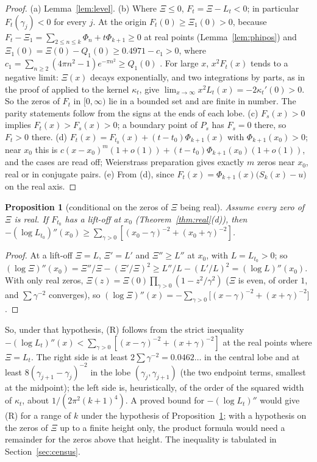 \documentclass[11pt]{article}
\theoremstyle{plain}
\newtheorem{proposition}[theorem]{Proposition}
\theoremstyle{definition}
\theoremstyle{remark}
\begin{document}
\begin{proof}
(a) Lemma~\ref{lem:level}.
(b) Where $\Xi \le 0$, $F_t = \Xi - L_t < 0$; in particular $F_t(\gamma_j) < 0$
for every $j$. At the origin $F_t(0) \ge \Xi_1(0) > 0$, because
$F_t - \Xi_1 = \sum_{2 \le n \le k}\Phi_n + t\Phi_{k+1} \ge 0$ at real points
(Lemma~\ref{lem:phipos}) and $\Xi_1(0) = \Xi(0) - Q_1(0) \ge 0.4971 - c_1 > 0$,
where $c_1 = \sum_{n \ge 2}(4\pi n^2 - 1)e^{-\pi n^2} \ge Q_1(0)$
\cite[proof of Corollary~3.5]{Tya}. For large $x$, $x^2F_t(x)$ tends to a
negative limit: $\Xi(x)$ decays exponentially, and two integrations by parts,
as in the proof of \cite[Proposition~3.4]{Tya} applied to the kernel
$\kappa_t$, give $\lim_{x\to\infty} x^2L_t(x) = -2\kappa_t'(0) > 0$. So the
zeros of $F_t$ in $[0,\infty)$ lie in a bounded set and are finite in number.
The parity statements follow from the signs at the ends of each lobe.
(c) $F_s(x) > 0$ implies $F_t(x) > F_s(x) > 0$; a boundary point of $P_s$ has
$F_s = 0$ there, so $F_t > 0$ there.
(d) $F_t(x) = F_{t_0}(x) + (t - t_0)\Phi_{k+1}(x)$ with $\Phi_{k+1}(x_0) > 0$;
near $x_0$ this is
$c(x - x_0)^m(1 + o(1)) + (t - t_0)\Phi_{k+1}(x_0)(1 + o(1))$, and the cases
are read off; Weierstrass preparation gives exactly $m$ zeros near $x_0$, real
or in conjugate pairs.
(e) From (d), since $F_t(x) = \Phi_{k+1}(x)\bigl(S_k(x) - u\bigr)$ on the real
axis.
\end{proof}


\begin{proposition}[conditional on the zeros of $\Xi$ being real]\label{prop:liftoff}
Assume every zero of $\Xi$ is real. If $F_{t_0}$ has a lift-off at $x_0$
(Theorem~\ref{thm:real}(d)), then
$-(\log L_{t_0})''(x_0) \ge \sum_{\gamma > 0}
[(x_0 - \gamma)^{-2} + (x_0 + \gamma)^{-2}]$.
\end{proposition}

\begin{proof}
At a lift-off $\Xi = L$, $\Xi' = L'$ and $\Xi'' \ge L''$ at $x_0$, with
$L = L_{t_0} > 0$; so
$(\log\Xi)''(x_0) = \Xi''/\Xi - (\Xi'/\Xi)^2 \ge L''/L - (L'/L)^2
= (\log L)''(x_0)$. With only real zeros,
$\Xi(z) = \Xi(0)\prod_{\gamma > 0}(1 - z^2/\gamma^2)$ ($\Xi$ is even, of
order $1$, and $\sum\gamma^{-2}$ converges), so
$(\log\Xi)''(x) = -\sum_{\gamma>0}\bigl[(x - \gamma)^{-2} + (x + \gamma)^{-2}\bigr]$.
\end{proof}

So, under that hypothesis, (R) follows from the strict inequality
$-(\log L_t)''(x) < \sum_{\gamma > 0}[(x - \gamma)^{-2} + (x + \gamma)^{-2}]$
at the real points where $\Xi = L_t$. The right side is at least
$2\sum\gamma^{-2} = 0.0462\ldots$ in the central lobe and at least
$8(\gamma_{j+1} - \gamma_j)^{-2}$ in the lobe $(\gamma_j, \gamma_{j+1})$ (the
two endpoint terms, smallest at the midpoint); the left side is, heuristically,
of the order of the squared width of $\kappa_t$, about $1/(2\pi^2(k+1)^4)$. A
proved bound for $-(\log L_t)''$ would give (R) for a range of $k$ under the
hypothesis of Proposition~\ref{prop:liftoff}; with a hypothesis on the zeros
of $\Xi$ up to a finite height only, the product formula would need a
remainder for the zeros above that height. The inequality is tabulated in
Section~\ref{sec:census}.
\end{document}

